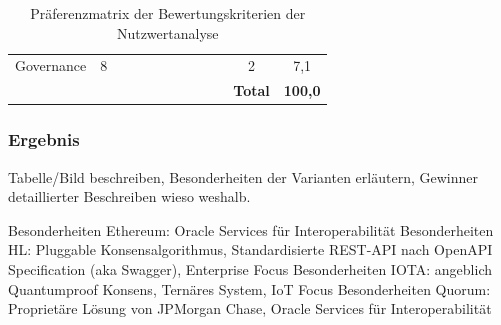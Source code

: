 \begin{table}[H]
{\begin{tabular}{@{}lccccccccccc@{}}
		Governance               & 8            & {\cellcolor{gray!25} } & {\cellcolor{gray!25} }  & {\cellcolor{gray!25} } & {\cellcolor{gray!25} } & {\cellcolor{gray!25} } & {\cellcolor{gray!25} } & {\cellcolor{gray!25} } & {\cellcolor{gray!25} } & 2               & 7,1                 \\ \addlinespace
		\midrule
		&              &                         &                          &                         &                         &                         &                         &                         &                         & \textbf{Total}  & \textbf{100,0}      \\
		\bottomrule
	\end{tabular}%
	}
	\caption{Präferenzmatrix der Bewertungskriterien der Nutzwertanalyse}
	\label{tab:preferencematrix}
\end{table}

\subsubsection{Ergebnis}
Tabelle/Bild beschreiben, Besonderheiten der Varianten erläutern, \glqq Gewinner \grqq{} detaillierter Beschreiben wieso weshalb.

Besonderheiten Ethereum: Oracle Services für Interoperabilität
Besonderheiten HL: Pluggable Konsensalgorithmus, Standardisierte REST-API nach OpenAPI Specification (aka Swagger), Enterprise Focus
Besonderheiten IOTA: angeblich Quantumproof Konsens, Ternäres System, IoT Focus
Besonderheiten Quorum: Proprietäre Lösung von JPMorgan Chase, Oracle Services für Interoperabilität

